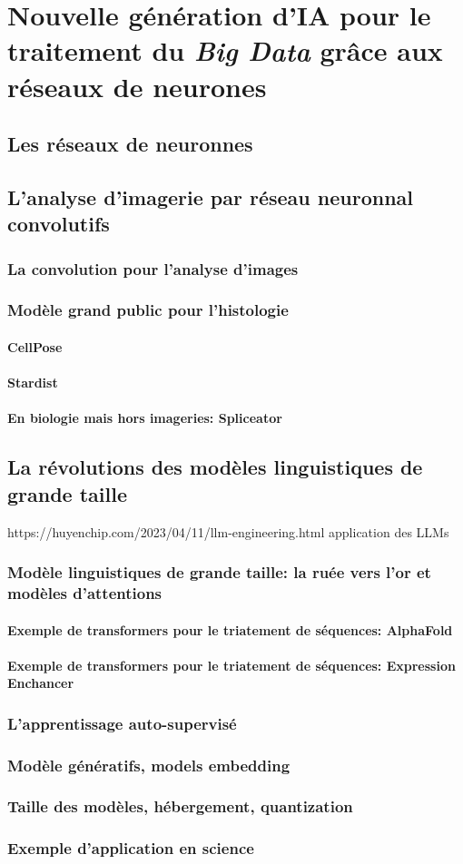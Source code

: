 \chapter{Nouvelle génération d’IA pour le traitement du \textit{Big Data} grâce aux réseaux de neurones}
\section{Les réseaux de neuronnes}
\section{L'analyse d'imagerie par  réseau neuronnal convolutifs}
\subsection{La convolution pour l'analyse d'images}
\subsection{Modèle grand public pour l'histologie}
\subsubsection{CellPose}
\subsubsection{Stardist}
\subsubsection{En biologie mais hors imageries: Spliceator}
\section{La révolutions des modèles linguistiques de grande taille}
https://huyenchip.com/2023/04/11/llm-engineering.html application des LLMs
\subsection{Modèle linguistiques de grande taille: la ruée vers l'or et modèles d'attentions}
\subsubsection{Exemple de transformers pour le triatement de séquences: AlphaFold}
\subsubsection{Exemple de transformers pour le triatement de séquences: Expression Enchancer}
\subsection{L'apprentissage auto-supervisé}
\subsection{Modèle génératifs, models embedding}
\subsection{Taille des modèles, hébergement, quantization}
\subsection{Exemple d'application en science}